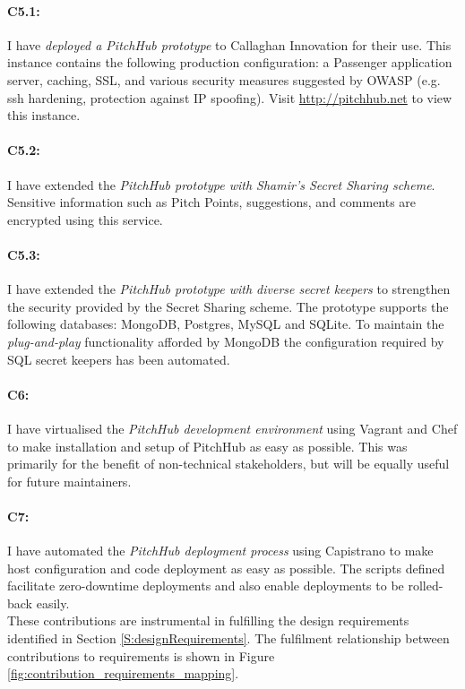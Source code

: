 \paragraph{C5.1:} I have {\em deployed a PitchHub prototype} to Callaghan Innovation for their use. This instance contains the following production configuration: a Passenger application server, caching, SSL, and various security measures suggested by OWASP (e.g. ssh hardening, protection against IP spoofing). Visit \url{http://pitchhub.net} to view this instance.


\paragraph{C5.2:} I have extended the {\em PitchHub prototype with Shamir's Secret Sharing scheme}. Sensitive information such as Pitch Points, suggestions, and comments are encrypted using this service.

\paragraph{C5.3:} I have extended the {\em PitchHub prototype with diverse secret keepers} to strengthen the security provided by the Secret Sharing scheme. The prototype supports the following databases: MongoDB, Postgres, MySQL and SQLite. To maintain the \textit{plug-and-play} functionality afforded by MongoDB the configuration required by SQL secret keepers has been automated.

\paragraph{C6:} I have virtualised the {\em PitchHub development environment} using Vagrant and Chef to make installation and setup of PitchHub as easy as possible. This was primarily for the benefit of non-technical stakeholders, but will be equally useful for future maintainers.

\paragraph{C7:} I have automated the {\em PitchHub deployment process} using Capistrano to make host configuration and code deployment as easy as possible. The scripts defined facilitate zero-downtime deployments and also enable deployments to be rolled-back easily.
\\
\newline
These contributions are instrumental in fulfilling the design requirements identified in Section \ref{S:designRequirements}. The fulfilment relationship between contributions to requirements is shown in Figure \ref{fig:contribution_requirements_mapping}.

